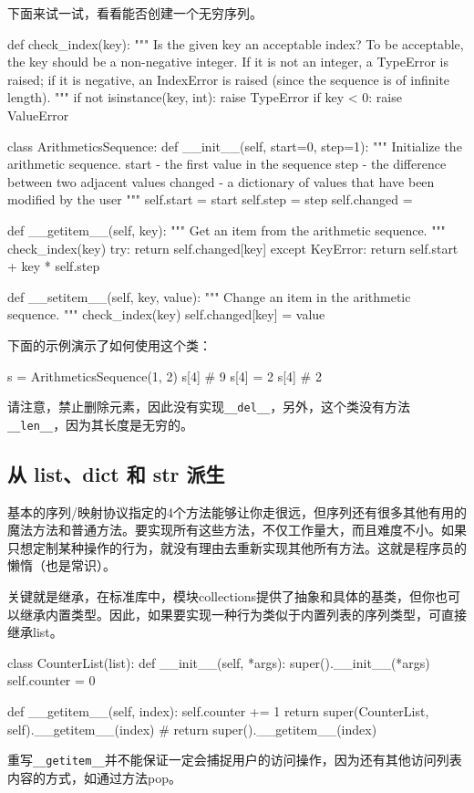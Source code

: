 下面来试一试，看看能否创建一个无穷序列。
\begin{pyc}
def check_index(key):
    """
    Is the given key an acceptable index?
    To be acceptable, the key should be a non-negative integer. 
    If it is not an integer, a TypeError is raised; 
    if it is negative, an IndexError is raised (since the sequence is of infinite length).
    """
    if not isinstance(key, int):
        raise TypeError
    if key < 0:
        raise ValueError
        
class ArithmeticsSequence:
    def __init__(self, start=0, step=1):
        """        
        Initialize the arithmetic sequence.
        start - the first value in the sequence
        step - the difference between two adjacent values
        changed - a dictionary of values that have been modified by the user
        """
        self.start = start
        self.step = step
        self.changed = {}

    def __getitem__(self, key):
        """
        Get an item from the arithmetic sequence.
        """
        check_index(key)
        try:
            return self.changed[key]
        except KeyError:
            return self.start + key * self.step

    def __setitem__(self, key, value):
        """
        Change an item in the arithmetic sequence.
        """
        check_index(key)
        self.changed[key] = value
\end{pyc}

下面的示例演示了如何使用这个类：
\begin{pyc}
s = ArithmeticsSequence(1, 2)
s[4]  # 9
s[4] = 2
s[4]  # 2
\end{pyc}

请注意，禁止删除元素，因此没有实现\verb|__del__|，另外，这个类没有方法\verb|__len__|，因为其长度是无穷的。

\subsection{从 list、dict 和 str 派生}
基本的序列/映射协议指定的4个方法能够让你走很远，但序列还有很多其他有用的魔法方法和普通方法。要实现所有这些方法，不仅工作量大，而且难度不小。如果只想定制某种操作的行为，就没有理由去重新实现其他所有方法。这就是程序员的懒惰（也是常识）。

关键就是继承，在标准库中，模块collections提供了抽象和具体的基类，但你也可以继承内置类型。因此，如果要实现一种行为类似于内置列表的序列类型，可直接继承list。

\begin{pyc}
class CounterList(list):
    def __init__(self, *args):
        super().__init__(*args)
        self.counter = 0

    def __getitem__(self, index):
        self.counter += 1
        return super(CounterList, self).__getitem__(index)
        # return super().__getitem__(index)
\end{pyc}
\begin{tcolorbox}
重写\verb|__getitem__|并不能保证一定会捕捉用户的访问操作，因为还有其他访问列表内容的方式，如通过方法pop。
\end{tcolorbox}


